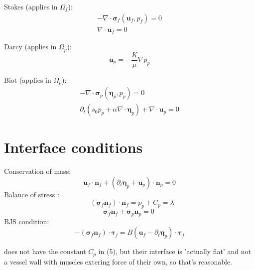 \documentclass{article}
\newcommand{\mathspace}[1]{\ensuremath{#1}\xspace} %
\newcommand{\sigmabf}{\mathspace{\boldsymbol{\sigma}}}
\newcommand{\grad}{\mathspace{\nabla}}
\renewcommand{\div}{\mathspace{\nabla \cdot}}
\newcommand{\ddt}[1]{\mathspace{\partial_t #1}}
\newcommand{\taubf}{\mathspace{\boldsymbol{\tau}}}
\newcommand{\stokes}{\mathspace{\Omega_{f}}}
\newcommand{\darcy}{\mathspace{\Omega_{p}}}
\newcommand{\nf}{\mathspace{\mathbf{n}_f}}
\newcommand{\np}{\mathspace{\mathbf{n}_p}}
\newcommand{\uf}{\mathspace{\mathbf{u}_f}}
\newcommand{\up}{\mathspace{\mathbf{u}_p}}
\newcommand{\pf}{\mathspace{p_f}}
\newcommand{\pp}{\mathspace{p_p}}
\newcommand{\disp}{\mathspace{\boldsymbol{\eta}_p}}
\begin{document}
Stokes (applies in \stokes):
\begin{subequations}
  \begin{align}
    - \div \sigmabf_f (\uf, \pf) = 0    \label{eq:stokes_stress} \\
    \div \uf = 0    \label{eq:stokes_conservation}
  \end{align}
\end{subequations}

Darcy (applies in \darcy):
\begin{equation}
    \up = - \frac {K} {\mu} \grad \pp     \label{eq:darcy}
  \end{equation}

  
Biot (applies in \darcy):
\begin{subequations}
  \begin{align}
    - \div \sigmabf_p (\disp, \pp) = 0     \label{eq:biot_stress} \\
    \ddt{} \left ( s_0 \pp + \alpha \div \disp \right ) + \div \up = 0    \label{eq:biot_conservation}
  \end{align}
\end{subequations}
\section{Interface conditions}

Conservation of mass:
\begin{equation}
\uf  \cdot \nf + \left ( \ddt{\disp} + \up \right ) \cdot \np = 0  \label{eq:massconservation}
\end{equation}
Balance of stress :
\begin{equation}
  -(\sigmabf_f \nf) \cdot \nf = \pp + C_p = \lambda  \label{eq:stressbalance1_mult}
\end{equation}
\begin{equation}
  \sigmabf_f \nf + \sigmabf_p \np = 0 \:  \label{eq:stressbalance2}
\end{equation}
BJS condition:
\begin{equation}
  -(\sigmabf_f \nf) \cdot \taubf_j = B \left ( \uf - \ddt{\disp} \right ) \cdot \taubf_j
  \label{eq:BJS}
\end{equation}


\cite{ambartsumyan} does not have the constant $C_p$ in (5), but their interface is 'actually flat' and not a vessel wall with muscles extering force of their own, so that's reasonable.
\end{document}
